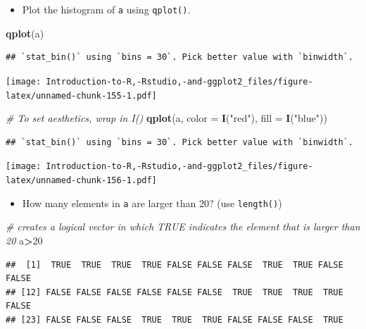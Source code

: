 \documentclass[]{book}
\newenvironment{Shaded}{\begin{snugshade}}{\end{snugshade}}
\newcommand{\CommentTok}[1]{\textcolor[rgb]{0.56,0.35,0.01}{\textit{#1}}}
\newcommand{\DataTypeTok}[1]{\textcolor[rgb]{0.13,0.29,0.53}{#1}}
\newcommand{\DecValTok}[1]{\textcolor[rgb]{0.00,0.00,0.81}{#1}}
\newcommand{\KeywordTok}[1]{\textcolor[rgb]{0.13,0.29,0.53}{\textbf{#1}}}
\newcommand{\NormalTok}[1]{#1}
\newcommand{\OperatorTok}[1]{\textcolor[rgb]{0.81,0.36,0.00}{\textbf{#1}}}
\newcommand{\StringTok}[1]{\textcolor[rgb]{0.31,0.60,0.02}{#1}}
\providecommand{\tightlist}{%
  \setlength{\itemsep}{0pt}\setlength{\parskip}{0pt}}
\begin{document}
\begin{itemize}
\tightlist
\item
  Plot the histogram of \texttt{a} using \texttt{qplot()}.
\end{itemize}

\begin{Shaded}
\begin{Highlighting}[]
\KeywordTok{qplot}\NormalTok{(a)}
\end{Highlighting}
\end{Shaded}

\begin{verbatim}
## `stat_bin()` using `bins = 30`. Pick better value with `binwidth`.
\end{verbatim}

\texttt{[image: Introduction-to-R,-Rstudio,-and-ggplot2\_files/figure-latex/unnamed-chunk-155-1.pdf]}

\begin{Shaded}
\begin{Highlighting}[]
\CommentTok{# To set aesthetics, wrap in I()}
\KeywordTok{qplot}\NormalTok{(a, }\DataTypeTok{color =} \KeywordTok{I}\NormalTok{(}\StringTok{"red"}\NormalTok{), }\DataTypeTok{fill =} \KeywordTok{I}\NormalTok{(}\StringTok{"blue"}\NormalTok{))}
\end{Highlighting}
\end{Shaded}

\begin{verbatim}
## `stat_bin()` using `bins = 30`. Pick better value with `binwidth`.
\end{verbatim}

\texttt{[image: Introduction-to-R,-Rstudio,-and-ggplot2\_files/figure-latex/unnamed-chunk-156-1.pdf]}

\begin{itemize}
\tightlist
\item
  How many elements in \texttt{a} are larger than 20? (use \texttt{length()})
\end{itemize}

\begin{Shaded}
\begin{Highlighting}[]
\CommentTok{# creates a logical vector in which TRUE indicates the element that is larger than 20}
\NormalTok{a}\OperatorTok{>}\DecValTok{20}
\end{Highlighting}
\end{Shaded}

\begin{verbatim}
##  [1]  TRUE  TRUE  TRUE  TRUE FALSE FALSE FALSE  TRUE  TRUE FALSE FALSE
## [12] FALSE FALSE FALSE FALSE FALSE FALSE  TRUE  TRUE  TRUE  TRUE FALSE
## [23] FALSE FALSE FALSE  TRUE  TRUE  TRUE FALSE FALSE FALSE  TRUE
\end{verbatim}
\end{document}
